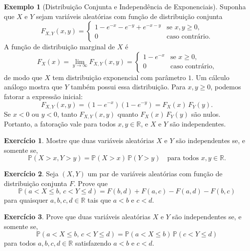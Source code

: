 \documentclass[12pt,portuguese]{article}
\theoremstyle{definition}
\newtheorem{example}[example]{Exemplo}
\theoremstyle{plainexercise}
\newtheorem{exercise}{Exercício}
\theoremstyle{starredexercise}
\theoremstyle{definition}
\begin{document}
\begin{example}[Distribuição Conjunta e Independência de Exponenciais]\label{ex:distribuicao-conjunta-exponenciais}
Suponha que $X$ e $Y$ sejam variáveis aleatórias com função de distribuição conjunta
\[
  F_{X,Y}(x, y) =
  \begin{cases}
    1 - e^{-x} - e^{-y} + e^{-x-y} & \text{se } x, y \geqslant 0,
    \\[0.2cm]
    0 & \text{caso contrário.}
  \end{cases}
\]
A função de distribuição marginal de $X$ é
\[
  F_X(x) = \lim_{y \to \infty} F_{X,Y}(x, y) =
  \begin{cases}
    1 - e^{-x} & \text{se } x \geqslant 0,
    \\[0.2cm]
    0 & \text{caso contrário,}
  \end{cases}
\]
de modo que $X$ tem distribuição exponencial com parâmetro $1$. Um cálculo
análogo mostra que $Y$ também possui essa distribuição.
Para $x, y \geqslant 0$, podemos fatorar a expressão inicial:
\[
  F_{X,Y}(x, y) = (1 - e^{-x})(1 - e^{-y}) = F_X(x)\,F_Y(y).
\]
Se $x < 0$ ou $y < 0$, tanto $F_{X,Y}(x, y)$ quanto
$F_X(x)\,F_Y(y)$ são nulos. Portanto, a fatoração vale para todos
$x, y \in \mathbb{R}$, e $X$ e $Y$ são independentes.
\end{example}

\begin{exercise}\label{exercise:independencia-probabilidades-cauda}
Mostre que duas variáveis aleatórias $X$ e $Y$ são independentes se, e somente se,
\[
  \mathbb{P}(X > x, Y > y) = \mathbb{P}(X > x)\,\mathbb{P}(Y > y)
  \quad\text{para todos } x, y \in \mathbb{R}.
\]
\end{exercise}

\begin{exercise}\label{exercise:probabilidade-retangulo-fdc}
Seja $(X, Y)$ um par de variáveis aleatórias com função de distribuição
conjunta $F$.
Prove que
\[
  \mathbb{P}(a < X \leqslant b, \, c < Y \leqslant d)
  = F(b, d) + F(a, c) - F(a, d) - F(b, c)
\]
para quaisquer $a, b, c, d \in \mathbb{R}$ tais que $a < b$ e $c < d$.
\end{exercise}

\begin{exercise}\label{exercise:independencia-retangulos}
Prove que duas variáveis aleatórias $X$ e $Y$ são independentes se, e somente se,
\[
  \mathbb{P}(a < X \leqslant b, \, c < Y \leqslant d)
  = \mathbb{P}(a < X \leqslant b)\,\mathbb{P}(c < Y \leqslant d)
\]
para todos $a, b, c, d \in \mathbb{R}$ satisfazendo $a < b$ e $c < d$.
\end{exercise}
\end{document}
